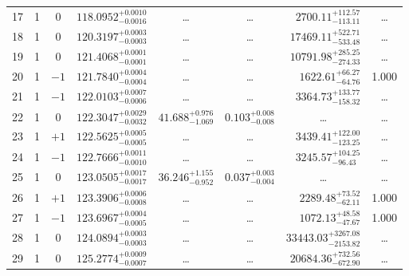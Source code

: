 \begin{table*}[!]
\begin{tabular}{llcrrlrc}
17 & 1 & 0 & $    118.0952_{-      0.0016}^{+      0.0010}$ & \multicolumn{1}{c}{\dots} & \multicolumn{1}{c}{\dots} & $     2700.11_{-      113.11}^{+      112.57}$ & \dots \\[1pt]
18 & 1 & 0 & $    120.3197_{-      0.0003}^{+      0.0003}$ & \multicolumn{1}{c}{\dots} & \multicolumn{1}{c}{\dots} & $    17469.11_{-      533.48}^{+      522.71}$ & \dots \\[1pt]
19 & 1 & 0 & $    121.4068_{-      0.0001}^{+      0.0001}$ & \multicolumn{1}{c}{\dots} & \multicolumn{1}{c}{\dots} & $    10791.98_{-      274.33}^{+      285.25}$ & \dots \\[1pt]
20 & 1 & $-1$ & $    121.7840_{-      0.0004}^{+      0.0004}$ & \multicolumn{1}{c}{\dots} & \multicolumn{1}{c}{\dots} & $     1622.61_{-       64.76}^{+       66.27}$ & 1.000\\[1pt]
21 & 1 & $-1$ & $    122.0103_{-      0.0006}^{+      0.0007}$ & \multicolumn{1}{c}{\dots} & \multicolumn{1}{c}{\dots} & $     3364.73_{-      158.32}^{+      133.77}$ & \dots \\[1pt]
22 & 1 & 0 & $    122.3047_{-      0.0032}^{+      0.0029}$ & $      41.688_{-       1.069}^{+       0.976}$ & $       0.103_{-       0.008}^{+       0.008}$ & \multicolumn{1}{c}{\dots} & \dots \\[1pt]
23 & 1 & $+1$ & $    122.5625_{-      0.0005}^{+      0.0005}$ & \multicolumn{1}{c}{\dots} & \multicolumn{1}{c}{\dots} & $     3439.41_{-      123.25}^{+      122.00}$ & \dots \\[1pt]
24 & 1 & $-1$ & $    122.7666_{-      0.0010}^{+      0.0011}$ & \multicolumn{1}{c}{\dots} & \multicolumn{1}{c}{\dots} & $     3245.57_{-       96.43}^{+      104.25}$ & \dots \\[1pt]
25 & 1 & 0 & $    123.0505_{-      0.0017}^{+      0.0017}$ & $      36.246_{-       0.952}^{+       1.155}$ & $       0.037_{-       0.004}^{+       0.003}$ & \multicolumn{1}{c}{\dots} & \dots \\[1pt]
26 & 1 & $+1$ & $    123.3906_{-      0.0008}^{+      0.0006}$ & \multicolumn{1}{c}{\dots} & \multicolumn{1}{c}{\dots} & $     2289.48_{-       62.11}^{+       73.52}$ & 1.000\\[1pt]
27 & 1 & $-1$ & $    123.6967_{-      0.0005}^{+      0.0004}$ & \multicolumn{1}{c}{\dots} & \multicolumn{1}{c}{\dots} & $     1072.13_{-       47.67}^{+       48.58}$ & 1.000 \\[1pt]
28 & 1 & 0 & $    124.0894_{-      0.0003}^{+      0.0003}$ & \multicolumn{1}{c}{\dots} & \multicolumn{1}{c}{\dots} & $    33443.03_{-     2153.82}^{+     3267.08}$ & \dots \\[1pt]
29 & 1 & 0 & $    125.2774_{-      0.0007}^{+      0.0009}$ & \multicolumn{1}{c}{\dots} & \multicolumn{1}{c}{\dots} & $    20684.36_{-      672.90}^{+      732.56}$ & \dots \\[1pt]


\end{tabular}
\end{table*}
